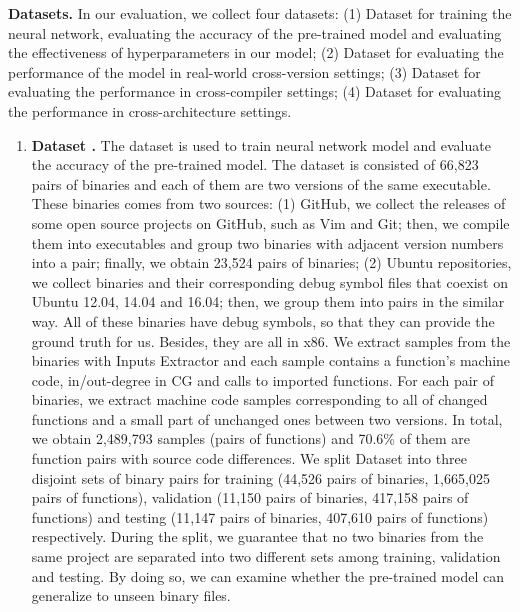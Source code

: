 \documentclass[10pt,conference]{IEEEtran}
\begin{document}
\textbf{Datasets.} In our evaluation, we collect four datasets: 
(1) Dataset \uppercase\expandafter{} for training the neural network, evaluating the accuracy of the pre-trained model
 and evaluating the effectiveness of hyperparameters in our model; 
(2) Dataset \uppercase\expandafter{} for evaluating the performance of the model in real-world cross-version settings; 
(3) Dataset \uppercase\expandafter{} for evaluating the performance in cross-compiler settings; 
(4) Dataset \uppercase\expandafter{} for evaluating the performance in cross-architecture settings.
\begin{enumerate}
\item \textbf{Dataset \uppercase\expandafter{}.} 
  The dataset is used to train neural network model and evaluate the accuracy of the pre-trained model. 
  The dataset is consisted of 66,823 pairs of binaries and each of them are two versions of the same
   executable. 
  These binaries comes from two sources:
   (1) GitHub, we collect the releases of some open source projects on GitHub, such as Vim and Git;
    then, we compile them into executables and group two binaries with adjacent version numbers into a pair;
     finally, we obtain 23,524 pairs of binaries; 
  (2) Ubuntu repositories, we collect binaries and their corresponding debug symbol files that coexist on
   Ubuntu 12.04, 14.04 and 16.04; then, we group them into pairs in the similar way. 
   All of these binaries have debug symbols, so that they can provide the ground truth for us. 
   Besides, they are all in x86. We extract samples from the binaries with Inputs Extractor and each sample 
   contains a function’s machine code, in/out-degree in CG and calls to imported functions. 
   For each pair of binaries, we extract machine code samples corresponding to all of changed functions and a small part
    of unchanged ones between two versions. In total, we obtain 2,489,793 samples (pairs of functions) and
     70.6\% of them are function pairs with source code differences. 
     We split Dataset \uppercase\expandafter{} into three disjoint sets of binary pairs for training (44,526 pairs of binaries, 1,665,025 pairs of functions),
      validation (11,150 pairs of binaries, 417,158 pairs of functions) and testing (11,147 pairs of binaries, 407,610 pairs of functions)
       respectively. During the split, 
    we guarantee that no two binaries from the same project are separated into two different sets among
     training, validation and testing. 
    By doing so, we can examine whether the pre-trained model can generalize to unseen binary files.  

\end{enumerate}
\end{document}
